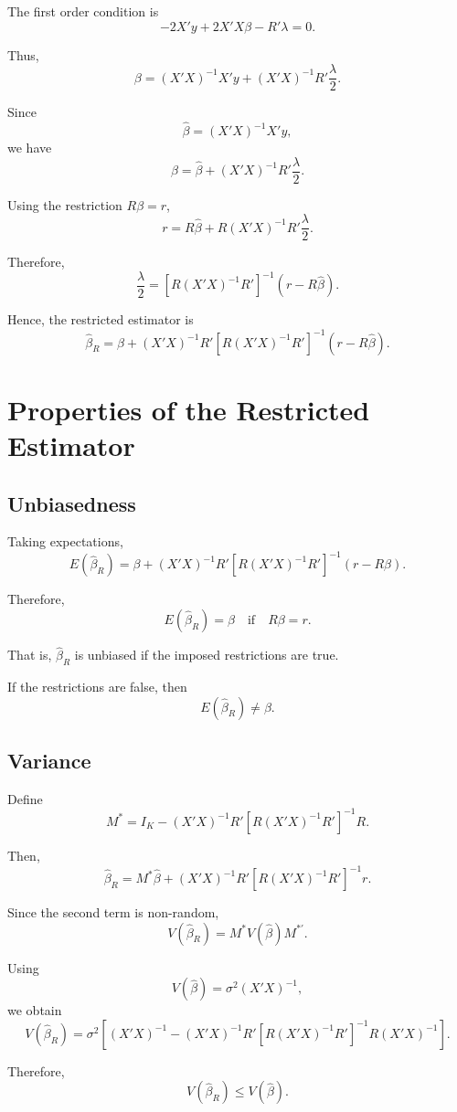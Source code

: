 The first order condition is
\[
-2X'y + 2X'X\beta - R'\lambda = 0.
\]

Thus,
\[
\beta
=
(X'X)^{-1}X'y
+
(X'X)^{-1}R'\frac{\lambda}{2}.
\]

Since
\[
\hat{\beta} = (X'X)^{-1}X'y,
\]
we have
\[
\beta
=
\hat{\beta}
+
(X'X)^{-1}R'\frac{\lambda}{2}.
\]

Using the restriction $R\beta = r$,
\[
r
=
R\hat{\beta}
+
R(X'X)^{-1}R'\frac{\lambda}{2}.
\]

Therefore,
\[
\frac{\lambda}{2}
=
\left[R(X'X)^{-1}R'\right]^{-1}
(r-R\hat{\beta}).
\]

Hence, the restricted estimator is
\[
\hat{\beta}_R
=
\hat{\beta}
+
(X'X)^{-1}R'
\left[R(X'X)^{-1}R'\right]^{-1}
(r-R\hat{\beta}).
\]

\section{Properties of the Restricted Estimator}

\subsection{Unbiasedness}

Taking expectations,
\[
E(\hat{\beta}_R)
=
\beta
+
(X'X)^{-1}R'
\left[R(X'X)^{-1}R'\right]^{-1}
(r-R\beta).
\]

Therefore,
\[
E(\hat{\beta}_R)=\beta
\quad \text{if} \quad R\beta=r.
\]

That is, $\hat{\beta}_R$ is unbiased if the imposed restrictions are true.

If the restrictions are false, then
\[
E(\hat{\beta}_R) \neq \beta.
\]

\subsection{Variance}

Define
\[
M^*
=
I_K
-
(X'X)^{-1}R'
\left[R(X'X)^{-1}R'\right]^{-1}R.
\]

Then,
\[
\hat{\beta}_R
=
M^*\hat{\beta}
+
(X'X)^{-1}R'
\left[R(X'X)^{-1}R'\right]^{-1}r.
\]

Since the second term is non-random,
\[
V(\hat{\beta}_R)
=
M^* V(\hat{\beta}) M^{*'}.
\]

Using
\[
V(\hat{\beta}) = \sigma^2 (X'X)^{-1},
\]
we obtain
\[
V(\hat{\beta}_R)
=
\sigma^2
\left[
(X'X)^{-1}
-
(X'X)^{-1}R'
\left[R(X'X)^{-1}R'\right]^{-1}
R(X'X)^{-1}
\right].
\]

Therefore,
\[
V(\hat{\beta}_R) \leq V(\hat{\beta}).
\]

